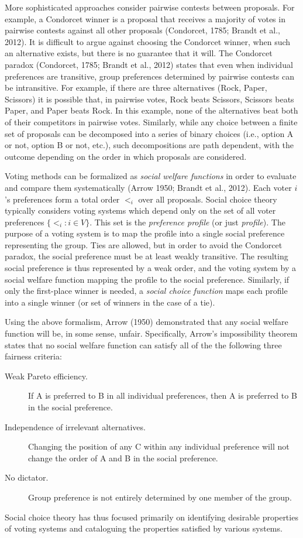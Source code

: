 More sophisticated approaches consider pairwise contests between proposals. For example, a Condorcet winner is a proposal that receives a majority of votes in pairwise contests against all other proposals (Condorcet, 1785; Brandt et al., 2012). It is difficult to argue against choosing the Condorcet winner, when such an alternative exists, but there is no guarantee that it will. The Condorcet paradox (Condorcet, 1785; Brandt et al., 2012) states that even when individual preferences are transitive, group preferences determined by pairwise contests can be intransitive. For example, if there are three alternatives (Rock, Paper, Scissors) it is possible that, in pairwise votes, Rock beats Scissors, Scissors beats Paper, and Paper beats Rock. In this example, none of the alternatives beat both of their competitors in pairwise votes. Similarly, while any choice between a finite set of proposals can be decomposed into a series of binary choices (i.e., option A or not, option B or not, etc.), such decompositions are path dependent, with the outcome depending on the order in which proposals are considered.

Voting methods can be formalized as {\em social welfare functions} in order to evaluate and compare them systematically (Arrow 1950; Brandt et al., 2012). Each voter $i$'s preferences form a total order $<_i$ over all proposals. Social choice theory typically considers voting systems which depend only on the set of all voter preferences $\{<_i: i \in V\}$. This set is the {\em preference profile} (or just {\em profile}). The purpose of a voting system is to map the profile into a single social preference representing the group. Ties are allowed, but in order to avoid the Condorcet paradox, the social preference must be at least weakly transitive. The resulting social preference is thus represented by a weak order, and the voting system by a social welfare function mapping the profile to the social preference. Similarly, if only the first-place winner is needed, a {\em social choice function} maps each profile into a single winner (or set of winners in the case of a tie).

Using the above formalism, Arrow (1950) demonstrated that any social welfare function will be, in some sense, unfair. Specifically, Arrow's impossibility theorem states that no social welfare function can satisfy all of the the following three fairness criteria:
\begin{description}
\item[Weak Pareto efficiency.]{If A is preferred to B in all individual preferences, then A is preferred to B in the social preference.}
\item[Independence of irrelevant alternatives.]{Changing the position of any C within any individual preference will not change the order of A and B in the social preference.}
\item[No dictator.]{Group preference is not entirely determined by one member of the group.}
\end{description}
Social choice theory has thus focused primarily on identifying desirable properties of voting systems and cataloguing the properties satisfied by various systems.

